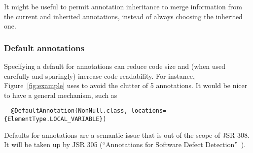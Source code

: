 \documentclass[10pt]{article}
\begin{document}
It might be useful to permit annotation inheritance to merge
information from the current and inherited annotations, instead of always
choosing the inherited one.





% 
% 

\subsubsection{Default annotations\label{default-annotations}}

Specifying a default for annotations can reduce code size and (when used
carefully and sparingly) increase code readability.  For instance,
Figure~\ref{fig:example} uses  to avoid the clutter of 5
 annotations.  It would be nicer to have a general mechanism,
such as
\begin{Verbatim}
  @DefaultAnnotation(NonNull.class, locations={ElementType.LOCAL_VARIABLE})
\end{Verbatim}
Defaults for annotations are a semantic issue that is
out of the scope of JSR 308.  It will be taken up by JSR 305 (``Annotations
for Software Defect Detection''~\cite{JSR305}).
\end{document}
